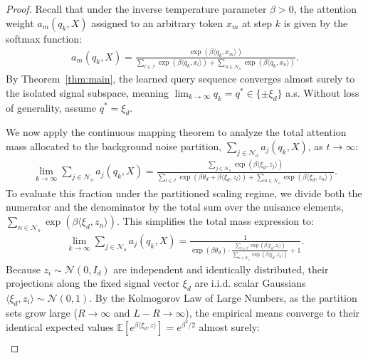 \documentclass[11pt,a4paper]{article}
\theoremstyle{definition}
\begin{document}
\begin{proof}
Recall that under the inverse temperature parameter $\beta > 0$, the attention weight $a_m(q_k,X)$ assigned to an arbitrary token $x_m$ at step $k$ is given by the softmax function:
\begin{align}
    a_m(q_k,X) = \frac{\exp(\beta \langle q_k, x_m \rangle)}{\sum_{l \in \mathcal{I}} \exp(\beta \langle q_k, x_l \rangle) + \sum_{n \in \mathcal{N}_o} \exp(\beta \langle q_k, x_n \rangle)}.
\end{align}
By Theorem~\ref{thm:main}, the learned query sequence converges almost surely to the isolated signal subspace, meaning $\lim_{k \to \infty} q_k = q^* \in \{\pm \xi_d\}$ a.s. Without loss of generality, assume $q^* = \xi_d$.

We now apply the continuous mapping theorem to analyze the total attention mass allocated to the background noise partition, $\sum_{j \in \mathcal{N}_o} a_j(q_k,X)$, as $t \to \infty$:
\begin{align}
    \lim_{k \to \infty} \sum_{j \in \mathcal{N}_o} a_j(q_k,X) = \frac{\sum_{j \in \mathcal{N}_o} \exp\left(\beta \langle \xi_d, z_j \rangle\right)}{\sum_{l \in \mathcal{I}} \exp\left(\beta \theta_d + \beta \langle \xi_d, z_l \rangle\right) + \sum_{n \in \mathcal{N}_o} \exp\left(\beta \langle \xi_d, z_n \rangle\right)}.
\end{align}
To evaluate this fraction under the partitioned scaling regime, we divide both the numerator and the denominator by the total sum over the nuisance elements, $\sum_{n \in \mathcal{N}_o} \exp\left(\beta \langle \xi_d, z_n \rangle\right)$. This simplifies the total mass expression to:
\begin{align}
    \lim_{k \to \infty} \sum_{j \in \mathcal{N}_o} a_j(q_k,X) = \frac{1}{\exp(\beta \theta_d) \cdot \frac{\sum_{l \in \mathcal{I}} \exp\left(\beta \langle \xi_d, z_l \rangle\right)}{\sum_{n \in \mathcal{N}_o} \exp\left(\beta \langle \xi_d, z_n \rangle\right)} + 1} \label{eq30}.
\end{align}
Because $z_i \sim \mathcal{N}(0, I_d)$ are independent and identically distributed, their projections along the fixed signal vector $\xi_d$ are i.i.d. scalar Gaussians $\langle \xi_d, z_i \rangle \sim \mathcal{N}(0, 1)$. By the Kolmogorov Law of Large Numbers, as the partition sets grow large ($R \to \infty$ and $L-R \to \infty$), the empirical means converge to their identical expected values $\mathbb{E}[e^{\beta \langle \xi_d, z \rangle}] = e^{\beta^2/2}$ almost surely:
\begin{align}

\end{align}
\end{proof}
\end{document}
